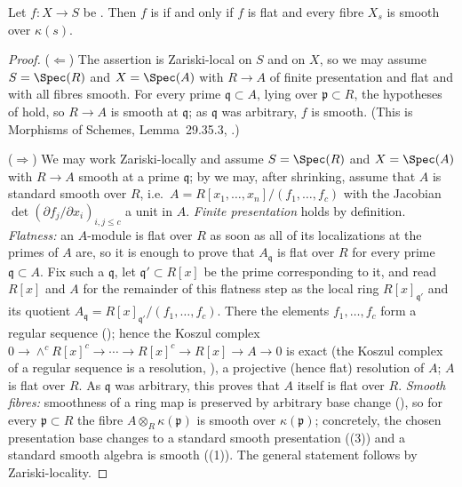 \begin{lemma}\label{lem:pc-smooth-characterization}
Let $f:X\to S$ be
.
Then $f$ is  if and only if $f$
is flat and every fibre $X_s$ is smooth over $\kappa(s)$.
\end{lemma}
\begin{proof}
($\Leftarrow$) The assertion is Zariski-local on $S$ and on $X$, so we
may assume $S=\Spec(R)$ and $X=\Spec(A)$ with $R\to A$ of finite
presentation and flat and with all fibres smooth.  For every prime
$\mathfrak q\subset A$, lying over $\mathfrak p\subset R$, the
hypotheses of  hold, so $R\to A$
is smooth at $\mathfrak q$; as $\mathfrak q$ was
arbitrary, $f$ is smooth.  (This is Morphisms of Schemes,
Lemma~29.35.3, .)

($\Rightarrow$) We may work Zariski-locally and assume $S=\Spec(R)$ and
$X=\Spec(A)$ with $R\to A$ smooth at a prime $\mathfrak q$; by
 we may, after shrinking, assume that
$A$ is standard smooth over $R$, i.e.\
$A=R[x_1,\dots,x_n]/(f_1,\dots,f_c)$ with the Jacobian
$\det(\partial f_j/\partial x_i)_{i,j\le c}$ a unit in $A$.
\emph{Finite presentation} holds by
definition.  \emph{Flatness:} an $A$-module is flat over $R$ as soon as
all of its localizations at the primes of $A$ are, so it is enough to
prove that $A_{\mathfrak q}$ is flat over $R$ for every prime
$\mathfrak q\subset A$.  Fix such a $\mathfrak q$, let
$\mathfrak q'\subset R[x]$ be the prime corresponding to it, and read
$R[x]$ and $A$ for the remainder of this flatness step as the local ring
$R[x]_{\mathfrak q'}$ and its quotient
$A_{\mathfrak q}=R[x]_{\mathfrak q'}/(f_1,\dots,f_c)$.  There the
elements $f_1,\dots,f_c$ form a regular sequence
(); hence the Koszul complex
$0\to\wedge^cR[x]^c\to\cdots\to R[x]^c\to R[x]\to A\to0$ is exact
(the Koszul complex of a regular sequence is a resolution,
), a projective
(hence flat) resolution of $A$; $A$ is flat over $R$.  As $\mathfrak q$
was arbitrary, this proves that $A$ itself is flat over $R$.
\emph{Smooth fibres:} smoothness of a ring map is preserved by
arbitrary base change (), so for
every $\mathfrak p\subset R$ the fibre
$A\otimes_R\kappa(\mathfrak p)$ is smooth over $\kappa(\mathfrak p)$;
concretely, the chosen presentation base changes to a standard smooth
presentation (\Cref{lem:pc-standard-smooth-properties}(3)) and a
standard smooth algebra is smooth
((1)).  The general statement
follows by Zariski-locality.
\end{proof}

